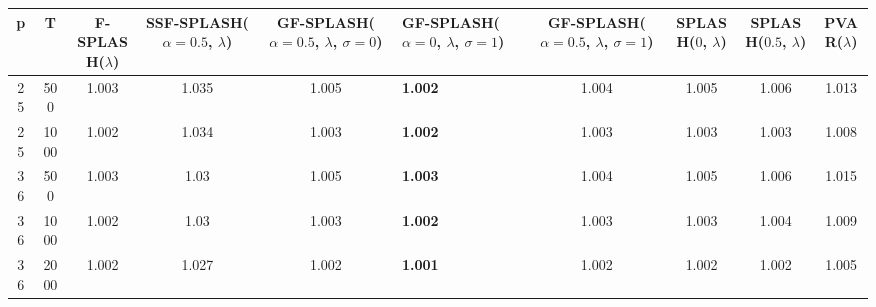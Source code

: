 \begin{tabular}{ccccclcccc}
\hline
  p  &  T   &  F-SPLASH($\lambda$)  &  SSF-SPLASH($\alpha=0.5$, $\lambda$)  &  GF-SPLASH($\alpha=0.5$, $\lambda$, $\sigma=0$)  & GF-SPLASH($\alpha=0$, $\lambda$, $\sigma=1$)   &  GF-SPLASH($\alpha=0.5$, $\lambda$, $\sigma=1$)  &  SPLASH($0$, $\lambda$)  &  SPLASH($0.5$, $\lambda$)  &  PVAR($\lambda$)  \\
\hline
 25  & 500  &         1.003         &                 1.035                 &                      1.005                       & \textbf{1.002}                                 &                      1.004                       &          1.005           &           1.006            &       1.013       \\
 25  & 1000 &         1.002         &                 1.034                 &                      1.003                       & \textbf{1.002}                                 &                      1.003                       &          1.003           &           1.003            &       1.008       \\
 36  & 500  &         1.003         &                 1.03                  &                      1.005                       & \textbf{1.003}                                 &                      1.004                       &          1.005           &           1.006            &       1.015       \\
 36  & 1000 &         1.002         &                 1.03                  &                      1.003                       & \textbf{1.002}                                 &                      1.003                       &          1.003           &           1.004            &       1.009       \\
 36  & 2000 &         1.002         &                 1.027                 &                      1.002                       & \textbf{1.001}                                 &                      1.002                       &          1.002           &           1.002            &       1.005       \\
\hline
\end{tabular}